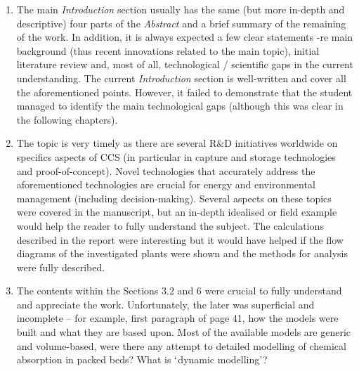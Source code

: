 \documentclass[14pt,twoside]{report}
\begin{document}
\begin{enumerate}
[41] K. Aziz, A. Settari, {\it Fundamentals of Reservoir Simulation}, Elsevier Applied Science Publishers, New York (USA), 1986.\\
\noindent
[42] R.B. Lowrie, $\lq$Compact higher-Order Numerical Methods for Hyperbolic Conservation Laws', PhD Thesis, Department of Aerospace Engineering and Scientific Computing, University of Michigan (USA), 1996.
%
\item The main {\it Introduction} section usually has the same (but more in-depth and descriptive) four parts of the {\it Abstract} and a brief summary of the remaining of the work. In addition, it is always expected a few clear statements -re main background (thus recent innovations related to the main topic), initial literature review and, most of all, technological / scientific gaps in the current understanding. The current {\it Introduction} section is well-written and cover all the aforementioned points. However, it failed to demonstrate that the student managed to identify the main technological gaps (although this was clear in the following chapters).
%
\item The topic is very timely as there are several R$\&$D initiatives worldwide on specifics aspects of CCS (in particular in capture and storage technologies and proof-of-concept). Novel technologies that accurately address the aforementioned technologies are crucial for energy and environmental management (including decision-making). Several aspects on these topics were covered in the manuscript, but an in-depth idealised or field example would help the reader to fully understand the subject. The calculations described in the report were interesting but it would have helped if the flow diagrams of the investigated plants were shown and the methods for analysis were fully described. 
%
\item The contents within the Sections 3.2 and 6 were crucial to fully understand and appreciate the work. Unfortunately, the later was superficial and incomplete -- for example, first paragraph of page 41, how the models were built and what they are based upon. Most of the available models are generic and volume-based, were there any attempt to detailed modelling of chemical absorption in packed beds? What is $\lq$dynamic modelling'? 
%
\end{enumerate}
\end{document}

